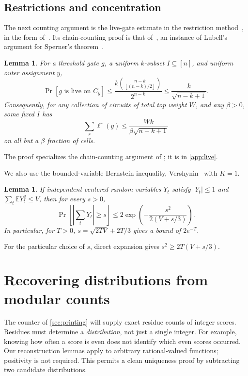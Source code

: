\documentclass[11pt,letterpaper]{article}
\newtheorem{lemma}[theorem]{Lemma}
\theoremstyle{definition}
\theoremstyle{remark}
\newcommand{\E}{\mathbb E}
\newcommand{\floor}[1]{\left\lfloor #1\right\rfloor}
\newcommand{\abs}[1]{\left|#1\right|}
\begin{document}
\subsection{Restrictions and concentration}

The next counting argument is the live-gate estimate in the
restriction method~\cite{KW16}, in the form
of~\cite[Lemma~4.1]{CTW26}. Its chain-counting proof is that
of~\cite[Appendix~A.3]{CTW26}, an instance of Lubell's argument for
Sperner's theorem~\cite{Lub66}.

\begin{lemma}\label{lem:live}
For a threshold gate \(g\), a uniform \(k\)-subset \(I\subseteq[n]\),
and uniform outer assignment \(y\),
\[
 \Pr[g\text{ is live on }C_y]
 \le \frac{k\binom{n-k}{\floor{(n-k)/2}}}{2^{n-k}}
 \le \frac{k}{\sqrt{n-k+1}}.
\]
Consequently, for any collection of circuits of total top weight
\(W\), and any \(\beta>0\), some fixed \(I\) has
\[
 \sum_r\ell^r(y)\le \frac{Wk}{\beta\sqrt{n-k+1}}
\]
on all but a \(\beta\) fraction of cells.
\end{lemma}
The proof specializes the chain-counting argument of
\cite[Appendix~A.3]{CTW26}; it is in \cref{app:live}.

We also use the bounded-variable Bernstein inequality,
Vershynin~\cite[Theorem~2.8.4, first edition]{Vershynin18} with \(K=1\).
\begin{lemma}\label{lem:bernstein}
If independent centered random variables \(Y_t\) satisfy
\(\abs{Y_t}\le1\) and \(\sum_t\E Y_t^2\le V\), then for every \(s>0\),
\[
 \Pr\!\left[\abs{\sum_tY_t}\ge s\right]
 \le2\exp\!\left(-\frac{s^2}{2(V+s/3)}\right).
\]
In particular, for \(T>0\), \(s=\sqrt{2TV}+2T/3\) gives a bound of \(2e^{-T}\).
\end{lemma}
For the particular choice of \(s\), direct expansion gives
\(s^2\ge2T(V+s/3)\).

\section{Recovering distributions from modular counts}\label{sec:windows}

The counter of \cref{sec:printing} will supply exact residue counts of
integer scores. Residues must determine a \emph{distribution}, not just
a single integer. For example, knowing how often a score is even does not
identify which even scores occurred. Our reconstruction lemmas apply
to arbitrary rational-valued functions; positivity is not required.
This permits a clean uniqueness proof by subtracting two candidate
distributions.
\end{document}
